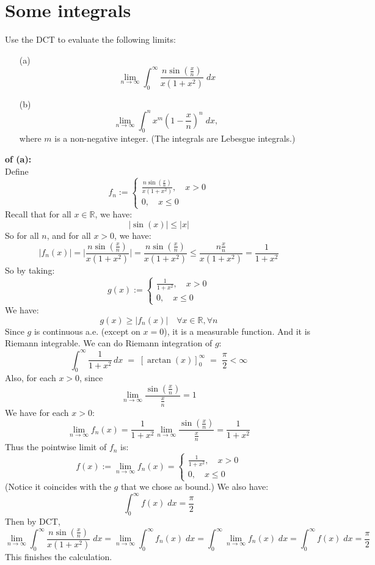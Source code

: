 \documentclass[lang=cn,11pt]{elegantbook}
\begin{document}
\section{Some integrals}
    Use the DCT to evaluate the following limits:
  \begin{itemize}
  \item[(a)]\[\
      \lim_{n\to \infty} \int_0^\infty \frac{n\sin\left(\frac{x}{n}\right)}{x(1+x^2)} \; d x
    \]
  \item[(b)] \[
      \lim_{n\to\infty} \int_0^n x^m \left( 1- \frac{x}{n} \right)^n \; d x,
    \]
    where $m$ is a non-negative integer. (The integrals are Lebesgue integrals.)
  \end{itemize}

\begin{solution}
    \textbf{of (a):}\\
    Define \[
    f_n := \begin{cases}
  \frac{n\sin\left(\frac{x}{n}\right)}{x(1+x^2)}  ,\quad        x > 0\\
  0, \quad x\leq 0
    \end{cases}
    \]
Recall that for all $x  \in \mathbb{R}$, we have: \[
|\sin(x)| \leq |x|
\]
So for all $n$, and for all $x>0$, we have: \[
|f_n (x)| = \Bigg| \frac{n\sin\left(\frac{x}{n}\right)}{x(1+x^2)} \Bigg|  =   \frac{n 
 \sin\left(\frac{x}{n}\right)   }{x(1+x^2)}\leq   
\frac{n \frac{x}{n} }{x(1+x^2)}   = \frac{1}{1+ x^2}
\]
So by taking: \[
g(x) := \begin{cases}
  \frac{1}{1+x^2}  ,\quad        x > 0\\
  0, \quad x\leq 0
    \end{cases}
\]
We have: \[
g(x) \geq |f_n(x)| \quad \forall x\in \mathbb{R}, \forall n
\]
Since $g$ is continuous a.e. (except on $x=0$), it is a measurable function. And it is Riemann integrable. We can do Riemann integration of $g$: \[
\int_{0}^{\infty}
\frac{1}{1 + x^2} \, dx
\;=\;
\left[\arctan(x)\right]_{0}^{\infty}
\;=\;
\frac{\pi}{2} < \infty
\]
Also, for each $x > 0$, since \[
\lim_{n\to \infty} \frac{\sin(\frac{x}{n})}{\frac{x}{n}} = 1
\]
We have for each $x > 0$: \[
\lim_{n \to \infty} f_n(x) = \frac{1}{1+ x^2 } \lim_{n\to \infty} \frac{\sin(\frac{x}{n})}{\frac{x}{n}}   =  \frac{1}{1+ x^2 }
\]
Thus the pointwise limit of $f_n$ is:  \[
f(x):=\lim_{n \to \infty} f_n(x) = \begin{cases}
  \frac{1}{1+x^2}  ,\quad        x > 0\\
  0, \quad x\leq 0
    \end{cases}
\]
(Notice it coincides with the $g$ that we chose as bound.) We also have: 
\[ \int_{0}^{\infty} f(x) \; dx = \frac{\pi}{2}
\]
Then by DCT, 
\[
\lim_{n\to \infty} \int_0^\infty \frac{n\sin\left(\frac{x}{n}\right)}{x(1+x^2)} \; d x =\lim_{n \to \infty} \int_{0}^{\infty} f_n(x) \; dx =\int_{0}^{\infty} \lim_{n\to \infty} f_n(x) \; dx = \int_{0}^{\infty} f(x) \; dx =   \frac{\pi}{2}
\]
This finishes the calculation.
\end{solution}
\end{document}
